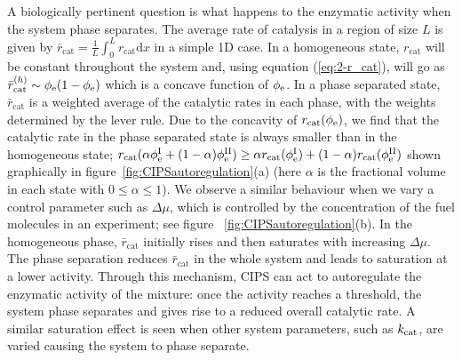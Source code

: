 A biologically pertinent question is what happens to the enzymatic activity when the system phase separates. The average rate of catalysis in a region of size $L$ is given by $\bar{r}_\mathrm{cat} = \frac{1}{L}\int_0^L r_\mathrm{cat} \mathrm{d}x$ in a simple 1D case. In a homogeneous state, $r_\mathrm{cat}$ will be constant throughout the system and, using equation (\ref{eq:2-r_cat}), will go as $\bar{r}_\mathrm{cat}^{\mathrm(h)}\sim\phi_{\mathrm{e}}(1-\phi_{\mathrm{e}})$ which is a concave function of $\phi_{\mathrm{e}}$. In a phase separated state, $\bar{r}_\mathrm{cat}$ is a weighted average of the catalytic rates in each phase, with the weights determined by the lever rule. Due to the concavity of $r_{\mathrm{cat}}(\phi_{\mathrm{e}})$, we find that the catalytic rate in the phase separated state is always smaller than in the homogeneous state; $r_{\mathrm{cat}}(\alpha\phi_{\mathrm{e}}^{\mathrm{I}}+(1-\alpha)\phi_{\mathrm{e}}^{\mathrm{II}}) \geq \alpha r_{\mathrm{cat}}(\phi_{\mathrm{e}}^{\mathrm{I}})+(1-\alpha)r_{\mathrm{cat}}(\phi_{\mathrm{e}}^{\mathrm{II}})$ shown graphically in figure~\ref{fig:CIPSautoregulation}(a) (here $\alpha$ is the fractional volume in each state with $0\leq \alpha \leq1$). We observe a similar behaviour when we vary a control parameter such as $\Delta\mu$, which is controlled by the concentration of the fuel molecules in an experiment; see figure ~\ref{fig:CIPSautoregulation}(b). In the homogeneous phase, $\bar{r}_\mathrm{cat}$ initially rises and then saturates with increasing $\Delta\mu$. The phase separation reduces $\bar{r}_\mathrm{cat}$ in the whole system and leads to saturation at a lower activity. Through this mechanism, CIPS can act to autoregulate the enzymatic activity of the mixture: once the activity reaches a threshold, the system phase separates and gives rise to a reduced overall catalytic rate. A similar saturation effect is seen when other system parameters, such as $k_{\mathrm{cat}}$, are varied causing the system to phase separate.


